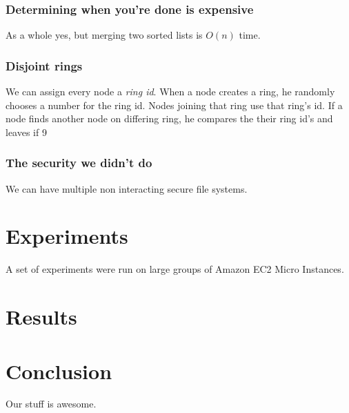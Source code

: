 \documentclass[conference, compsocconf, letterpaper]{IEEEtran}
\begin{document}
\subsubsection{Determining when you're done is expensive}
As a whole yes, but merging two sorted lists is $O(n)$ time. 


\subsubsection{Disjoint rings}
We can assign every node a \emph{ring id}.  When a node creates a ring, he randomly chooses a number for the ring id.  Nodes joining that ring use that ring's id.  If a node finds another node on differing ring, he compares the their ring id's and leaves if 9

\subsubsection{The security we didn't do}
We can have multiple non interacting secure file systems.


\section{Experiments}
A set of experiments were run on large groups of Amazon EC2 Micro Instances\cite{amazon-micro}.
\section{Results}

\section{Conclusion}
Our stuff \cite{code} is awesome.



\end{document}
